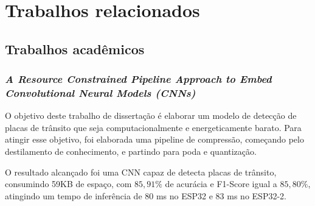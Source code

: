 \chapter{Trabalhos relacionados}\label{cap_trabalhos_relacionados}

\section{Trabalhos acadêmicos}

\subsection{\textit{A Resource Constrained Pipeline Approach to Embed Convolutional Neural Models (CNNs)}}
O objetivo deste trabalho de dissertação \cite{rafael} é elaborar um modelo de detecção de placas de trânsito que seja
computacionalmente e energeticamente barato. Para atingir esse objetivo, foi elaborada uma pipeline de compressão,
começando pelo destilamento de conhecimento, e partindo para poda e quantização.

O resultado alcançado foi uma CNN capaz de detecta placas de trânsito, consumindo 59KB de espaço, com $85,91\%$ de
acurácia e F1-Score igual a $85,80\%$, atingindo um tempo de inferência de 80 ms no ESP32 e 83 ms no ESP32-2.
